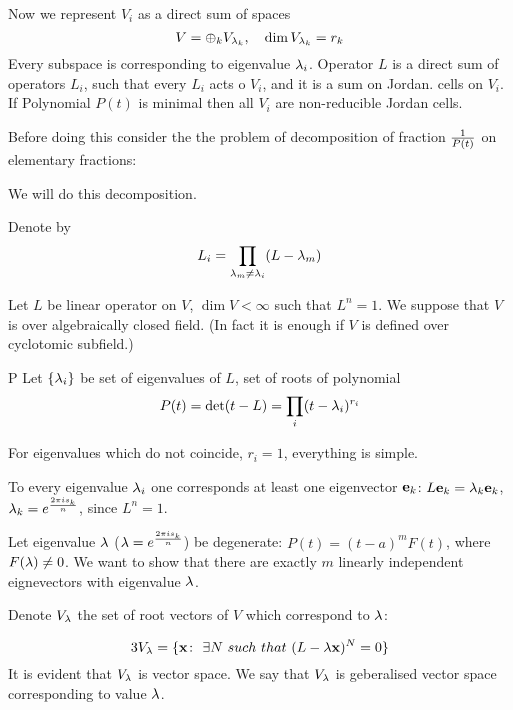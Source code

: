 Now we represent $V_i$ as a direct sum of spaces
         $$
V=\oplus_{k}V_{\lambda_k}, \quad \dim V_{\lambda_k}=r_k
         $$
Every subspace is corresponding to eigenvalue $\lambda_i$.
 Operator $L$ is a direct sum of operators $L_i$,
 such that every $L_i$ acts o $V_i$, and
it is a sum on Jordan. cells on $V_i$.
If Polynomial $P(t)$ is minimal then all $V_i$
are non-reducible Jordan cells.

Before doing this consider the the problem
of decomposition of fraction $1\over P(t)$
on elementary fractions:



  We will do this decomposition.

Denote by
      $$
L_i=\prod_{\lambda_m\not=\lambda_i}(L-\lambda_m)
      $$




  Let $L$ be linear operator on $V$, $\dim V<\infty$
such that $L^n=1$.
We suppose that $V$ is over algebraically closed field.
(In fact it is enough if $V$ is defined over 
cyclotomic subfield.)

P
  Let $\{\lambda_i\}$ be set of eigenvalues of $L$, set of roots
of polynomial $$
   P(t)=\det (t-L)=\prod_i(t-\lambda_i)^{r_i}
      $$

For eigenvalues which do not coincide, $r_i=1$, everything is simple.

To every eigenvalue $\lambda_i$ one corresponds at least
one eigenvector ${\bf e}_k$: $L{\bf e}_k=\lambda_k{\bf e}_k$, $\lambda_k={e^{2\pi i s_k\over n}}$,
since $L^n=1$.

  Let eigenvalue $\lambda$ ($\lambda=e^{2\pi is_k\over n}$) be 
degenerate: $P(t)=(t-a)^mF(t)$, where $F(\lambda)\not=0$.
 We want to show that there are exactly $m$ linearly independent
eignevectors with eigenvalue $\lambda$.


Denote $V_\lambda$ the set of root vectors of $V$ which correspond to $\lambda$:
                
      $$3
     V_\lambda=\{{\bf x}\colon \,\, \exists N \,\, {such\,\, that}\,\, (L-\lambda{\bf x})^N=0\}
       $$
It is evident that $V_\lambda$ is vector space. We say that $V_\lambda$ is
geberalised vector space corresponding to value $\lambda$.

\bye
    
